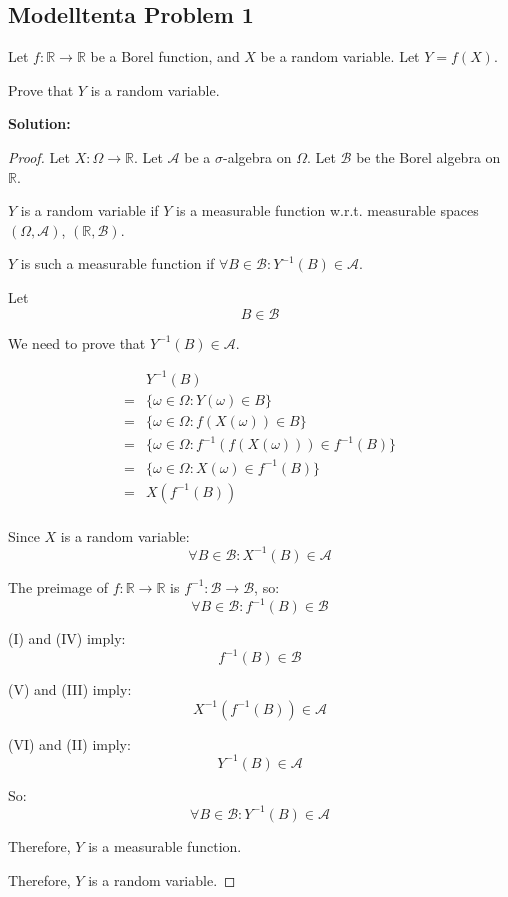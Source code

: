 \documentclass{article}
\begin{document}
\subsection{Modelltenta Problem 1}

Let \(f : \mathbb{R} \to \mathbb{R}\) be a Borel function, and \(X\) be a
random variable. Let \(Y = f(X)\).

Prove that \(Y\) is a random variable.

\textbf{Solution:}

\begin{proof}
Let \(X:\Omega\to \mathbb{R}\).
Let \(\mathcal{A}\) be a \(\sigma\)-algebra on \(\Omega\).
Let \(\mathcal{B}\) be the Borel algebra on \(\mathbb{R}\).

\(Y\) is a random variable if \(Y\) is a measurable function w.r.t. measurable
spaces \((\Omega, \mathcal{A})\), \((\mathbb{R}, \mathcal{B})\).

\(Y\) is such a measurable function if \(\forall B\in \mathcal{B}: Y^{-1}(B)\in \mathcal{A}\).

Let
\[B\in \mathcal{B}\tag{I}\]

We need to prove that \(Y^{-1}(B)\in \mathcal{A}\).

\begin{align*}
	 & Y^{-1}(B) \\
	=& \{\omega\in \Omega: Y(\omega)\in B\} \\
	=& \{\omega\in \Omega: f(X(\omega))\in B\} \\
	=& \{\omega\in \Omega: f^{-1}(f(X(\omega)))\in f^{-1}(B)\} \\
	=& \{\omega\in \Omega: X(\omega)\in f^{-1}(B)\} \\
	=& X(f^{-1}(B)) \tag{II} \\
\end{align*}

Since \(X\) is a random variable:
\[\forall B\in \mathcal{B}: X^{-1}(B)\in \mathcal{A} \tag{III}\]

The preimage of \(f:\mathbb{R}\to\mathbb{R}\) is \(f^{-1}: \mathcal{B} \to\mathcal{B}\), so:
\[\forall B \in \mathcal{B}: f^{-1}(B)\in \mathcal{B} \tag{IV}\]

(I) and (IV) imply:
\[f^{-1}(B) \in \mathcal{B} \tag{V}\]

(V) and (III) imply:
\[X^{-1}(f^{-1}(B))\in \mathcal{A}\tag{VI}\]

(VI) and (II) imply:
\[Y^{-1}(B) \in \mathcal{A}\]

So:
\[\forall B\in \mathcal{B}:Y^{-1}(B) \in \mathcal{A}\]

Therefore, \(Y\) is a measurable function.

Therefore, \(Y\) is a random variable.
\end{proof}
\end{document}
